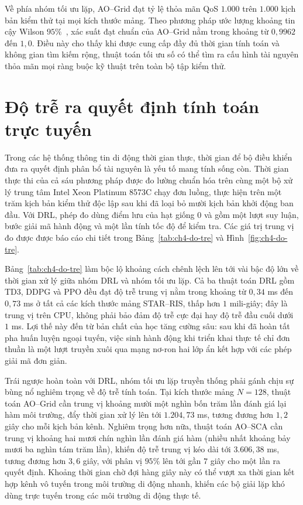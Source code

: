Về phía nhóm tối ưu lặp, AO--Grid đạt tỷ lệ thỏa mãn QoS $1.000$ trên $1.000$ kịch bản kiểm thử tại mọi kích thước
mảng. Theo phương pháp ước lượng khoảng tin cậy Wilson $95\%$~\cite{Wilson1927}, xác suất đạt chuẩn của AO--Grid
nằm trong khoảng từ $0,9962$ đến $1,0$. Điều này cho thấy khi được cung cấp đầy đủ thời gian tính toán và không gian
tìm kiếm rộng, thuật toán tối ưu số có thể tìm ra cấu hình tài nguyên thỏa mãn mọi ràng buộc kỹ thuật trên toàn bộ
tập kiểm thử.

\section{Độ trễ ra quyết định tính toán trực tuyến}
\label{sec:do-tre}

Trong các hệ thống thông tin di động thời gian thực, thời gian để bộ điều khiển đưa ra quyết định phân bổ tài nguyên
là yếu tố mang tính sống còn. Thời gian thực thi của cả sáu phương pháp được đo lường chuẩn hóa trên cùng một bộ xử
lý trung tâm Intel Xeon Platinum 8573C chạy đơn luồng, thực hiện trên một trăm kịch bản kiểm thử độc lập sau khi đã
loại bỏ mười kịch bản khởi động ban đầu. Với DRL, phép đo dùng điểm lưu của hạt giống 0 và gồm một lượt suy luận,
bước giải mã hành động và một lần tính tốc độ để kiểm tra. Các giá trị trung vị đo được được báo cáo chi tiết trong
Bảng~\ref{tab:ch4-do-tre} và Hình~\ref{fig:ch4-do-tre}.





Bảng~\ref{tab:ch4-do-tre} làm bộc lộ khoảng cách chênh lệch lên tới vài bậc độ lớn về thời gian xử lý giữa nhóm DRL
và nhóm tối ưu lặp. Cả ba thuật toán DRL gồm TD3, DDPG và PPO đều đạt độ trễ trung vị nằm trong khoảng từ $0,34$ ms
đến $0,73$ ms ở tất cả các kích thước mảng STAR--RIS, thấp hơn $1$ mili-giây; đây là trung vị trên CPU, không phải
bảo đảm độ trễ cực đại hay độ trễ đầu cuối dưới $1$ ms. Lợi thế này đến từ bản chất của học tăng cường sâu: sau khi
đã hoàn tất pha huấn luyện ngoại tuyến, việc sinh hành động khi triển khai thực tế chỉ đơn thuần là một lượt truyền
xuôi qua mạng nơ-ron hai lớp ẩn kết hợp với các phép giải mã đơn giản.

Trái ngược hoàn toàn với DRL, nhóm tối ưu lặp truyền thống phải gánh chịu sự bùng nổ nghiêm trọng về độ trễ tính
toán. Tại kích thước mảng $N = 128$, thuật toán AO--Grid cần trung vị khoảng mười một nghìn bốn trăm lần đánh giá lại
hàm môi trường, đẩy thời gian xử lý lên tới $1.204,73$ ms, tương đương hơn $1,2$ giây cho mỗi kịch bản kênh. Nghiêm
trọng hơn nữa, thuật toán AO--SCA cần trung vị khoảng hai mươi chín nghìn lần đánh giá hàm (nhiều nhất khoảng bảy
mươi ba nghìn tám trăm lần), khiến độ trễ trung vị kéo dài tới $3.606,38$ ms, tương đương hơn $3,6$ giây, với phân vị
$95\%$ lên tới gần $7$ giây cho một lần ra quyết định. Khoảng thời gian chờ đợi hàng giây này có thể vượt xa thời
gian kết hợp kênh vô tuyến trong môi trường di động nhanh, khiến các bộ giải lặp khó dùng trực tuyến trong các môi
trường di động thực tế.

